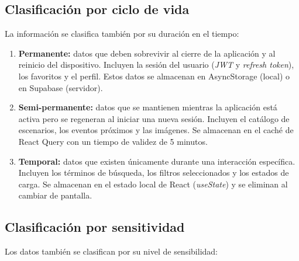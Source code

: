 \subsection{Clasificaci\'on por ciclo de vida}

La informaci\'on se clasifica tambi\'en por su duraci\'on en el tiempo:

\begin{enumerate}
  \item \textbf{Permanente:} datos que deben sobrevivir al cierre de la
    aplicaci\'on y al reinicio del dispositivo. Incluyen la sesi\'on del
    usuario (\textit{JWT} y \textit{refresh token}), los favoritos y el
    perfil. Estos datos se almacenan en AsyncStorage (local) o en Supabase
    (servidor).

  \item \textbf{Semi-permanente:} datos que se mantienen mientras la
    aplicaci\'on est\'a activa pero se regeneran al iniciar una nueva
    sesi\'on. Incluyen el cat\'alogo de escenarios, los eventos pr\'oximos
    y las im\'agenes. Se almacenan en el cach\'e de React Query con un
    tiempo de validez de 5 minutos.

  \item \textbf{Temporal:} datos que existen \'unicamente durante una
    interacci\'on espec\'ifica. Incluyen los t\'erminos de b\'usqueda,
    los filtros seleccionados y los estados de carga. Se almacenan en
    el estado local de React (\textit{useState}) y se eliminan al
    cambiar de pantalla.
\end{enumerate}

\subsection{Clasificaci\'on por sensitividad}

Los datos tambi\'en se clasifican por su nivel de sensibilidad:

\begin{table}[H]
  \centering
  \caption{Clasificaci\'on por nivel de sensibilidad}
\end{table}

